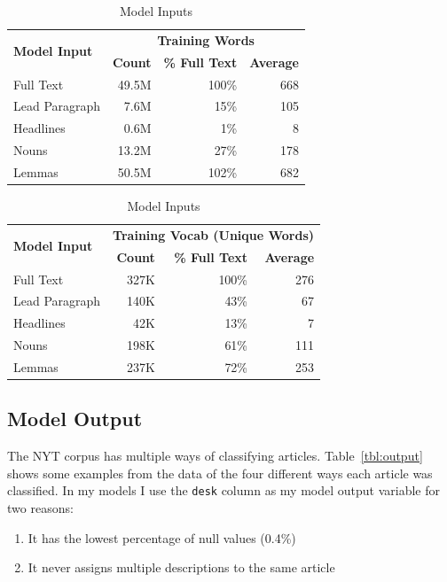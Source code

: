 \documentclass[11pt,a4paper,table]{article}
\begin{document}
\begin{table}
	\centering
	\small
	\begin{tabular}{lrrr}
		\toprule
		\multirow{2}{*}{\textbf{Model Input}} & \multicolumn{3}{c}{\textbf{Training Words}} \\
		\cmidrule{2-4}
		& \textbf{Count} & \textbf{\% Full Text} & \textbf{Average} \\
		\midrule
		Full Text			& 49.5M	& 100\%	& 668 \\
		Lead Paragraph	& 7.6M	& 15\%	& 105 \\
		Headlines			& 0.6M	& 1\%	& 8 \\
		Nouns			& 13.2M	& 27\%	& 178 \\
		Lemmas			& 50.5M	& 102\%	& 682 \\
		\bottomrule
	\end{tabular}
	\begin{tabular}{lrrr}
		\toprule
		\multirow{2}{*}{\textbf{Model Input}} & \multicolumn{3}{c}{\textbf{Training Vocab (Unique Words)}} \\
		\cmidrule{2-4}
		& \textbf{Count} & \textbf{\% Full Text} & \textbf{Average} \\
		\midrule
		Full Text			& 327K	& 100\%	& 276 \\
		Lead Paragraph	& 140K	& 43\%	& 67 \\
		Headlines			& 42K	& 13\%	& 7 \\
		Nouns			& 198K	& 61\%	& 111 \\
		Lemmas			& 237K	& 72\%	& 253 \\
		\bottomrule
	\end{tabular}
	\caption{Model Inputs}
	\label{tbl:inputs}
\end{table}

\subsection{Model Output}
\label{ssec:output}

The NYT corpus has multiple ways of classifying articles. Table~\ref{tbl:output} shows some examples from the data of the four different ways each article was classified. In my models I use the \texttt{desk} column as my model output variable for two reasons:

\begin{enumerate}
\item It has the lowest percentage of null values (0.4\%)
\item It never assigns multiple descriptions to the same article
\end{enumerate}
\end{document}
